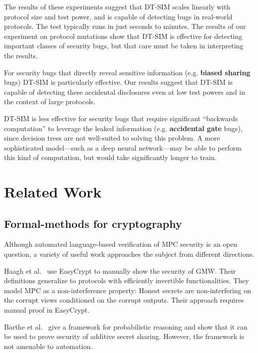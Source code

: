 \documentclass[compsoc, conference, a4paper, 10pt, times]{IEEEtran}
\newcommand{\toolname}{\textsc{DT-SIM}\xspace}
\begin{document}
The results of these experiments suggest that \toolname scales linearly with protocol size and test power, and is capable of detecting bugs in real-world protocols. The test typically runs in just seconds to minutes. The results of our experiment on protocol mutations show that \toolname is effective for detecting important classes of security bugs, but that care must be taken in interpreting the results.

For security bugs that directly reveal sensitive information (e.g. \textbf{biased sharing} bugs) \toolname is particularly effective. Our results suggest that \toolname is capable of detecting these accidental disclosures even at low test powers and in the context of large protocols.

\toolname is less effective for security bugs that require significant ``backwards computation'' to leverage the leaked information (e.g. \textbf{accidental gate} bugs), since decision trees are not well-suited to solving this problem. A more sophisticated model---such as a deep neural network---may be able to perform this kind of computation, but would take significantly longer to train.



\section{Related Work}

\subsection{Formal-methods for cryptography}
Although automated language-based verification of MPC security is an open question,
a variety of useful work approaches the subject from different directions.

Haagh et al.~\cite{haagh2018computer} %
use EasyCrypt to manually show the security of GMW.
Their definitions generalize to protocols with efficiently invertible functionalities.
They model MPC as a non-interference property: Honest secrets are non-interfering on the corrupt views conditioned on the corrupt outputs.
Their approach requires manual proof in EasyCrypt.

Barthe et al.~\cite{barthe2019probabilistic} %
give a framework for probabilistic reasoning and show that it can be used to prove security of additive secret sharing.
However, the framework is not amenable to automation.
\end{document}
